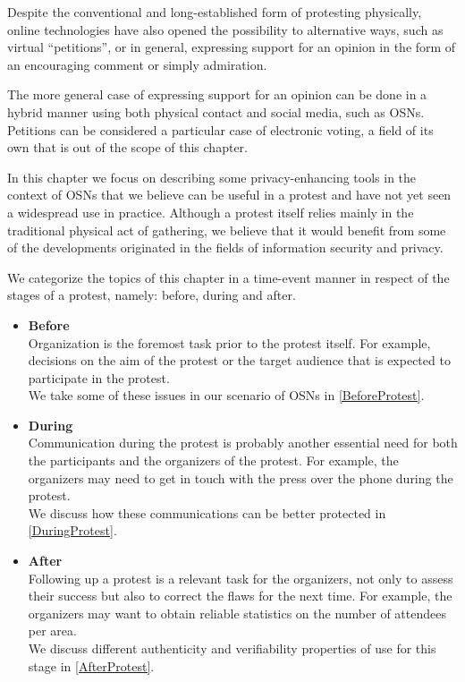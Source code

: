 Despite the conventional and long-established form of protesting physically, online 
technologies have also opened the possibility to alternative ways, such as virtual 
\enquote{petitions}, or in general, expressing support for an opinion in the form 
of an encouraging comment or simply admiration. 

The more general case of expressing support for an opinion can be done in a hybrid 
manner using both physical contact and social media, such as \acp{OSN}. Petitions 
can be considered a particular case of electronic voting, a field of its own that 
is out of the scope of this chapter. 

In this chapter we focus on describing some privacy-enhancing tools in the context 
of \acp{OSN} that we believe can be useful in a protest and have not yet seen a 
widespread use in practice. Although a protest itself relies mainly in the traditional 
physical act of gathering, we believe that it would benefit from some of the developments 
originated in the fields of information security and privacy.

We categorize the topics of this chapter in a time-event manner in respect of the 
stages of a protest, namely: before, during and after.
\begin{itemize}
    \item \textbf{Before}\\
    Organization is the foremost task prior to the protest itself. 
    For example, decisions on the aim of the protest or the target audience that 
    is expected to participate in the protest.\\
    We take some of these issues in our scenario of \acp{OSN} in \cref{BeforeProtest}.

    \item \textbf{During}\\
    Communication during the protest is probably another essential 
    need for both the participants and the organizers of the protest. For example, 
    the organizers may need to get in touch with the press over the phone during 
    the protest.\\
    We discuss how these communications can be better protected in \cref{DuringProtest}.

    \item \textbf{After}\\
    Following up a protest is a relevant task for the organizers, not 
    only to assess their success but also to correct the flaws for the next time. 
    For example, the organizers may want to obtain reliable statistics on the number 
    of attendees per area.\\
    We discuss different authenticity and verifiability properties of use for this 
    stage in \cref{AfterProtest}.
\end{itemize}

